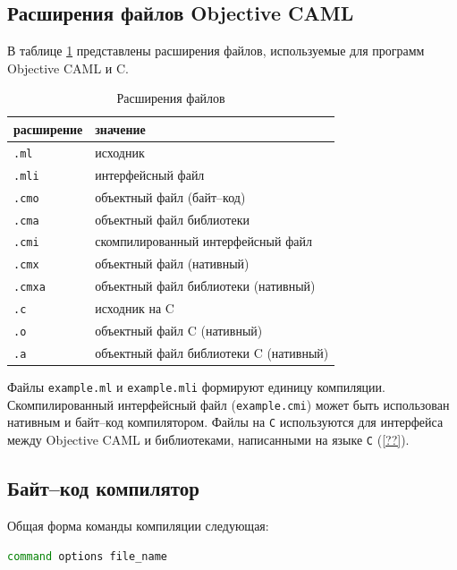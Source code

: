 \subsection{Расширения файлов Objective CAML}

В таблице \ref{tbl:file_extensions} представлены расширения файлов, используемые
для программ Objective CAML и C.

\begin{table}[hc]
	\centering
	\caption{\label{tbl:file_extensions}Расширения файлов}
	\begin{tabular}{|l|l|}
	\hline
	расширение & значение \\
	\hline
	\texttt{.ml} & исходник \\
	\hline
	\texttt{.mli} & интерфейсный файл \\
	\hline
	\texttt{.cmo} & объектный файл (байт--код) \\
	\hline
	\texttt{.cma} & объектный файл библиотеки \\
	\hline
	\texttt{.cmi} & скомпилированный интерфейсный файл \\
	\hline
	\texttt{.cmx} & объектный файл (нативный) \\
	\hline
	\texttt{.cmxa} & объектный файл библиотеки (нативный) \\
	\hline
	\texttt{.c} & исходник на C \\
	\hline
	\texttt{.o} & объектный файл C (нативный) \\
	\hline
	\texttt{.a} & объектный файл библиотеки C (нативный) \\
	\hline
	\end{tabular}
\end{table}

Файлы \texttt{example.ml} и \texttt{example.mli} формируют единицу компиляции.
Скомпилированный интерфейсный файл (\texttt{example.cmi}) может быть использован
нативным и байт--код компилятором. Файлы на \texttt{C} используются для
интерфейса между Objective CAML и библиотеками, написанными на языке \texttt{C}
(\ref{??}).

\subsection{Байт--код компилятор}

Общая форма команды компиляции следующая:

\begin{lstlisting}[language=Bash]
command options file_name
\end{lstlisting}

